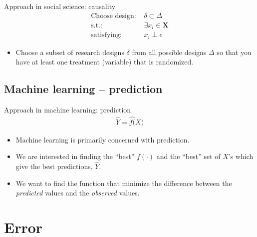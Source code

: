 \documentclass{beamer}
\begin{document}
\begin{frame}{Approach in social science: causality} %
\begin{align*}
\text{Choose design: }& 	\delta \subset \Delta \\
\text{s.t.: } & \exists x_{i} \in \mathbf{X} \\
\text{satisfying: } &  x_{i} \perp \epsilon 
\end{align*}

 \begin{itemize}
 	\item Choose a subset of research designs $\delta$ from all possible designs $\Delta$ so that you have at least one treatment (variable) that is randomized. 
 \end{itemize}
\end{frame}

\subsection*{Machine learning -- prediction}

\begin{frame}{Approach in machine learning: prediction} %
\begin{align*}
		\hat{Y} = \hat{f(}X)
\end{align*}

 \begin{itemize}
 	\item Machine learning is primarily concerned with prediction.
 	\item We are interested in finding the ``best'' $f(\cdot)$ and the ``best'' set of $X$'s which give the best predictions, $\hat{Y}$.
 	\item We want to find the function that minimize the difference between the \textit{predicted} values and the \textit{observed} values.
 \end{itemize}
\end{frame}

\section*{Error}
\end{document}
